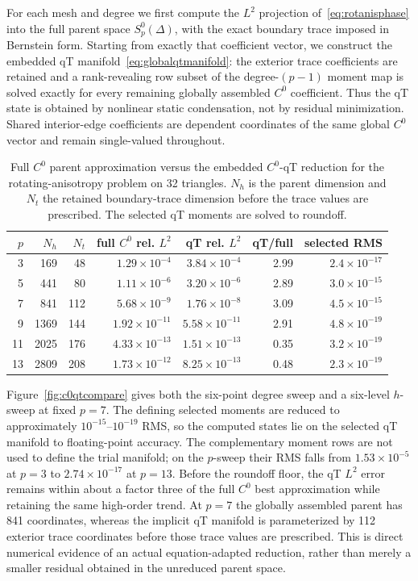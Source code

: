 \documentclass[preprint,12pt]{elsarticle}
\begin{document}
For each mesh and degree we first compute the $L^2$ projection of~\eqref{eq:rotanisphase} into the full parent space $S_p^0(\Delta)$, with the exact boundary trace imposed in Bernstein form.  Starting from exactly that coefficient vector, we construct the embedded qT manifold~\eqref{eq:globalqtmanifold}: the exterior trace coefficients are retained and a rank-revealing row subset of the degree-$(p-1)$ moment map is solved exactly for every remaining globally assembled $C^0$ coefficient.  Thus the qT state is obtained by nonlinear static condensation, not by residual minimization.  Shared interior-edge coefficients are dependent coordinates of the same global $C^0$ vector and remain single-valued throughout.

\begin{table}[t]
\centering
\small
\caption{Full $C^0$ parent approximation versus the embedded $C^0$-qT reduction for the rotating-anisotropy problem on 32 triangles.  $N_h$ is the parent dimension and $N_t$ the retained boundary-trace dimension before the trace values are prescribed.  The selected qT moments are solved to roundoff.}
\label{tab:c0qtcompare}
\begin{tabular}{rrrrrrr}
\toprule
$p$ & $N_h$ & $N_t$ & full $C^0$ rel. $L^2$ & qT rel. $L^2$ & qT/full & selected RMS\\
\midrule
3  & 169  & 48  & $1.29\times10^{-4}$ & $3.84\times10^{-4}$ & 2.99 & $2.4\times10^{-17}$\\
5  & 441  & 80  & $1.11\times10^{-6}$ & $3.20\times10^{-6}$ & 2.89 & $3.0\times10^{-15}$\\
7  & 841  & 112 & $5.68\times10^{-9}$ & $1.76\times10^{-8}$ & 3.09 & $4.5\times10^{-15}$\\
9  & 1369 & 144 & $1.92\times10^{-11}$ & $5.58\times10^{-11}$ & 2.91 & $4.8\times10^{-19}$\\
11 & 2025 & 176 & $4.33\times10^{-13}$ & $1.51\times10^{-13}$ & 0.35 & $3.2\times10^{-19}$\\
13 & 2809 & 208 & $1.73\times10^{-12}$ & $8.25\times10^{-13}$ & 0.48 & $2.3\times10^{-19}$\\
\bottomrule
\end{tabular}
\end{table}

Figure~\ref{fig:c0qtcompare} gives both the six-point degree sweep and a six-level $h$-sweep at fixed $p=7$.  The defining selected moments are reduced to approximately $10^{-15}$--$10^{-19}$ RMS, so the computed states lie on the selected qT manifold to floating-point accuracy.  The complementary moment rows are not used to define the trial manifold; on the $p$-sweep their RMS falls from $1.53\times10^{-5}$ at $p=3$ to $2.74\times10^{-17}$ at $p=13$.  Before the roundoff floor, the qT $L^2$ error remains within about a factor three of the full $C^0$ best approximation while retaining the same high-order trend.  At $p=7$ the globally assembled parent has 841 coordinates, whereas the implicit qT manifold is parameterized by 112 exterior trace coordinates before those trace values are prescribed.  This is direct numerical evidence of an actual equation-adapted reduction, rather than merely a smaller residual obtained in the unreduced parent space.
\end{document}
